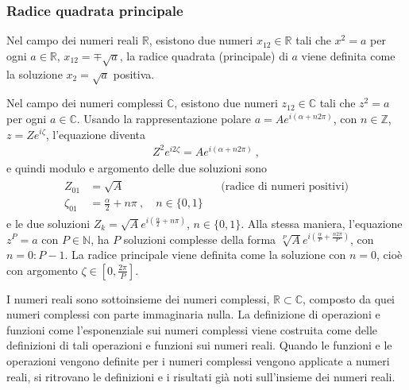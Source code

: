 \documentclass[letterpaper,10pt,italian]{jupyterBook}
\begin{document}
\subsubsection*{Radice quadrata principale}

\sphinxAtStartPar
Nel campo dei numeri reali \(\mathbb{R}\), esistono due numeri \(x_{12} \in \mathbb{R}\) tali che \(x^2 = a\) per ogni  \(a \in \mathbb{R}\), \(x_{12} = \mp \sqrt{a}\), la radice quadrata (principale) di \(a\) viene definita come la soluzione \(x_2 = \sqrt{a}\) positiva.

\sphinxAtStartPar
Nel campo dei numeri complessi \(\mathbb{C}\), esistono due numeri \(z_{12} \in \mathbb{C}\) tali che \(z^2 = a\) per ogni  \(a \in \mathbb{C}\). Usando la rappresentazione polare \(a = A e^{i \left(\alpha + n 2 \pi\right)}\), con \(n \in \mathbb{Z}\), \(z = Z e^{i \zeta}\), l’equazione diventa
\begin{equation*}
\begin{split}Z^2 e^{i 2 \zeta} = A e^{i ( \alpha + n 2 \pi )} \ ,\end{split}
\end{equation*}
\sphinxAtStartPar
e quindi modulo e argomento delle due soluzioni sono
\begin{equation*}
\begin{split}\begin{aligned}
  Z_{01} & = \sqrt{A}  && \text{(radice di numeri positivi)}  \\
  \zeta_{01} & = \frac{\alpha}{2} + n \pi \ , \quad n \in \{ 0, 1\} 
\end{aligned}\end{split}
\end{equation*}
\sphinxAtStartPar
e le due soluzioni \(Z_{k} = \sqrt{A} e^{i\left( \frac{\alpha}{2} + n\pi \right)}\), \(n \in \{ 0 , 1 \}\). Alla stessa maniera, l’equazione \(z^P = a\) con \(P \in \mathbb{N}\), ha \(P\) soluzioni complesse della forma \(\sqrt[P]{A} e^{i \left( \frac{\alpha}{P} + \frac{n 2 \pi}{P} \right)}\), con \(n = 0: P-1\). La radice principale viene definita come la soluzione con \(n = 0\), cioè con argomento \(\zeta \in \left[ 0, \frac{2 \pi}{P} \right]\).

\sphinxAtStartPar
I numeri reali sono sottoinsieme dei numeri complessi, \(\mathbb{R} \subset \mathbb{C}\), composto da quei numeri complessi con parte immaginaria nulla. La definizione di operazioni e funzioni \sphinxhyphen{} come l’esponenziale \sphinxhyphen{} sui numeri complessi viene costruita come  delle definizioni di tali operazioni e funzioni sui numeri reali. Quando le funzioni e le operazioni vengono definite per i numeri complessi vengono applicate a numeri reali, si ritrovano le definizioni e i risultati già noti sull’insieme dei numeri reali.
\end{document}
